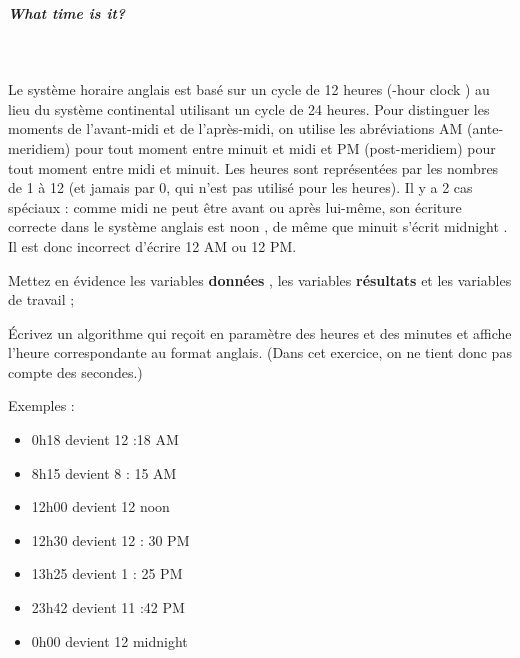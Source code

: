 \documentclass[11pt,a4paper]{article}
\begin{document}
			
		\subparagraph{What time is it?} 
		
					\textcolor{white}{.} \par
				
          Le syst\`eme horaire anglais est bas\'e sur un cycle de 12 heures (-hour clock \guillemotright ) au lieu du syst\`eme continental utilisant un cycle de 24 heures. 
          Pour distinguer les moments de l'avant-midi et de l'apr\`es-midi, on utilise les abr\'eviations AM (ante-meridiem) pour tout moment entre minuit et midi 
          et PM (post-meridiem) pour tout moment entre midi et minuit. 
          Les heures sont repr\'esent\'ees par les nombres de 1 \`a 12 (et jamais par 0, qui n'est pas utilis\'e pour les heures). 
          Il y a 2 cas sp\'eciaux : comme midi ne peut \^etre avant ou apr\`es lui-m\^eme, son \'ecriture correcte dans le syst\`eme anglais est  noon \guillemotright , de m\^eme que minuit s'\'ecrit  midnight \guillemotright . 
          Il est donc incorrect d'\'ecrire 12 AM ou 12 PM. 
        
            \par
        
          Mettez en \'evidence les variables \textbf{\guillemotleft  donn\'ees \guillemotright }, 
          les variables \textbf{\guillemotleft  r\'esultats \guillemotright } et les variables de travail ;
        
            \par
        
          \'Ecrivez un algorithme qui re\c coit en param\`etre des heures et des minutes et affiche l'heure correspondante au format anglais. (Dans cet exercice, on ne tient donc pas compte des secondes.)
        
            \par
        
          Exemples : 	
          
					\begin{itemize}
				
			\item 0h18 devient 12 :18 AM
			\item 8h15 devient 8 : 15 AM
			\item 12h00 devient 12 noon
			\item 12h30 devient 12 : 30 PM
			\item 13h25 devient 1 : 25 PM
			\item 23h42 devient 11 :42 PM
			\item 0h00 devient 12 midnight
					\end{itemize}
				
\end{document}
